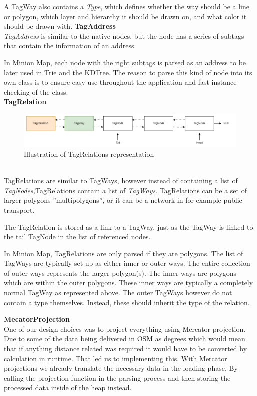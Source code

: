 A TagWay also contains a \textit{Type}, which defines whether the way should be a line or polygon, which layer and hierarchy it should be drawn on, and what color it should be drawn with.
\newpage
\textbf{TagAddress}\\
\textit{TagAddress }is similar to the native nodes, but the node has a series of subtags that contain the information of an address. 

In Minion Map, each node with the right subtags is parsed as an address to be later used in Trie and the KDTree. The reason to parse this kind of node into its own class is to ensure easy use throughout the application and fast instance checking of the class. \\

\textbf{TagRelation}\\
\begin{figure}[ht]%
  \centering
  \includegraphics[width=14.5cm]{docs/material/TagRelation.png}%
  \caption{\centering Illustration of TagRelations representation}\label{TagRelation}%
\end{figure}\\
TagRelations are similar to TagWays, however instead of containing a list of \textit{TagNodes,}TagRelations contain a list of \textit{TagWays}. TagRelations can be a set of larger polygons ”multipolygons”, or it can be a network in for example public transport.

The TagRelation is stored as a link to a TagWay, just as the TagWay is linked to the tail TagNode in the list of referenced nodes. 

In Minion Map, TagRelations are only parsed if they are polygons. The list of TagWays are typically set up as either inner or outer ways. The entire collection of outer ways represents the larger polygon(s). The inner ways are polygons which are within the outer polygons. These inner ways are typically a completely normal TagWay as represented above. The outer TagWays however do not contain a type themselves. Instead, these should inherit the type of the relation.

\textbf{MecatorProjection}\\
One of our design choices was to project everything using Mercator projection. Due to some of the data being delivered in OSM as degrees which would mean that if anything distance related was required it would have to be converted by calculation in runtime. That led us to implementing this. With Mercator projections we already translate the necessary data in the loading phase. By calling the projection function in the parsing process and then storing the processed data inside of the heap instead.

